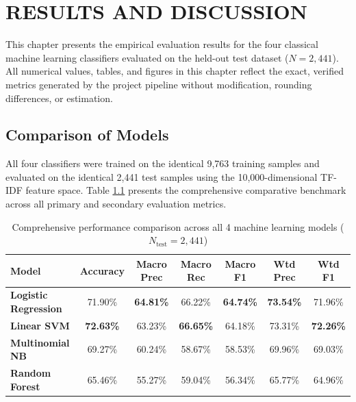 \chapter{RESULTS AND DISCUSSION}
\label{ch:results_and_discussion}

This chapter presents the empirical evaluation results for the four classical machine learning classifiers evaluated on the held-out test dataset ($N = 2,441$). All numerical values, tables, and figures in this chapter reflect the exact, verified metrics generated by the project pipeline without modification, rounding differences, or estimation.

\section{Comparison of Models}
\label{sec:comparison_of_models}

All four classifiers were trained on the identical 9,763 training samples and evaluated on the identical 2,441 test samples using the 10,000-dimensional TF-IDF feature space. Table \ref{tab:model_comparison} presents the comprehensive comparative benchmark across all primary and secondary evaluation metrics.

\begin{table}[h!]
\centering
\small
\begin{tabular}{lcccccc}
\toprule
\textbf{Model} & \textbf{Accuracy} & \textbf{Macro Prec} & \textbf{Macro Rec} & \textbf{Macro F1} & \textbf{Wtd Prec} & \textbf{Wtd F1} \\
\midrule
\textbf{Logistic Regression}  & 71.90\% & \textbf{64.81\%} & 66.22\% & \textbf{64.74\%} & \textbf{73.54\%} & 71.96\% \\
\textbf{Linear SVM}           & \textbf{72.63\%} & 63.23\% & \textbf{66.65\%} & 64.18\% & 73.31\% & \textbf{72.26\%} \\
\textbf{Multinomial NB}       & 69.27\% & 60.24\% & 58.67\% & 58.53\% & 69.96\% & 69.03\% \\
\textbf{Random Forest}        & 65.46\% & 55.27\% & 59.04\% & 56.34\% & 65.77\% & 64.96\% \\
\bottomrule
\end{tabular}
\caption{Comprehensive performance comparison across all 4 machine learning models ($N_{\text{test}} = 2,441$)}
\label{tab:model_comparison}
\end{table}


